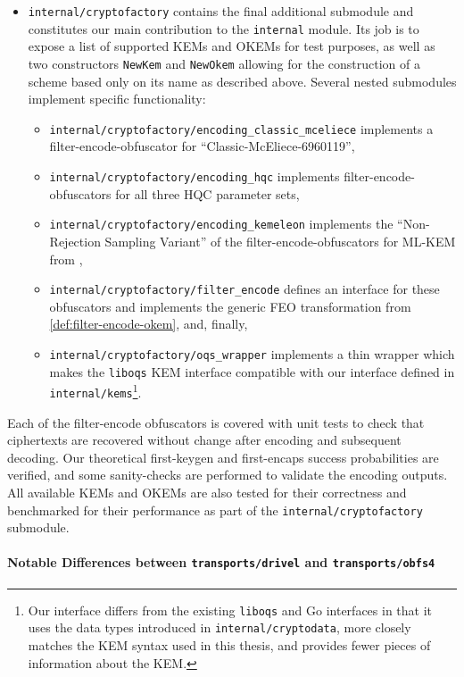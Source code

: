 \begin{itemize}
    \item \texttt{internal/cryptofactory} contains the final additional submodule and constitutes our main contribution to the \texttt{internal} module. Its job is to expose a list of supported KEMs and OKEMs for test purposes, as well as two constructors \texttt{NewKem} and \texttt{NewOkem} allowing for the construction of a scheme based only on its name as described above. Several nested submodules implement specific functionality:
    \begin{itemize}
        \item \texttt{internal/cryptofactory/encoding\_classic\_mceliece} implements a filter-encode-obfuscator for ``Classic-McEliece-6960119'',
        \item \texttt{internal/cryptofactory/encoding\_hqc} implements filter-encode-obfuscators for all three HQC parameter sets,
        \item \texttt{internal/cryptofactory/encoding\_kemeleon} implements the ``Non-Rejection Sampling Variant'' of the filter-encode-obfuscators for ML-KEM from \cite{irtf-cfrg-kemeleon-00},
        \item \texttt{internal/cryptofactory/filter\_encode} defines an interface for these obfuscators and implements the generic FEO transformation from \cref{def:filter-encode-okem}, and, finally,
        \item \texttt{internal/cryptofactory/oqs\_wrapper} implements a thin wrapper which makes the \texttt{liboqs} KEM interface compatible with our interface defined in \texttt{internal/kems}\footnote{Our interface differs from the existing \texttt{liboqs} and Go interfaces in that it uses the data types introduced in \texttt{internal/cryptodata}, more closely matches the KEM syntax used in this thesis, and provides fewer pieces of information about the KEM.}.
    \end{itemize}
\end{itemize}

Each of the filter-encode obfuscators is covered with unit tests to check that ciphertexts are recovered without change after encoding and subsequent decoding. Our theoretical first-keygen and first-encaps success probabilities are verified, and some sanity-checks are performed to validate the encoding outputs. All available KEMs and OKEMs are also tested for their correctness and benchmarked for their performance as part of the \texttt{internal/cryptofactory} submodule.

\paragraph{Notable Differences between \texttt{transports/drivel} and \texttt{transports/obfs4}}

